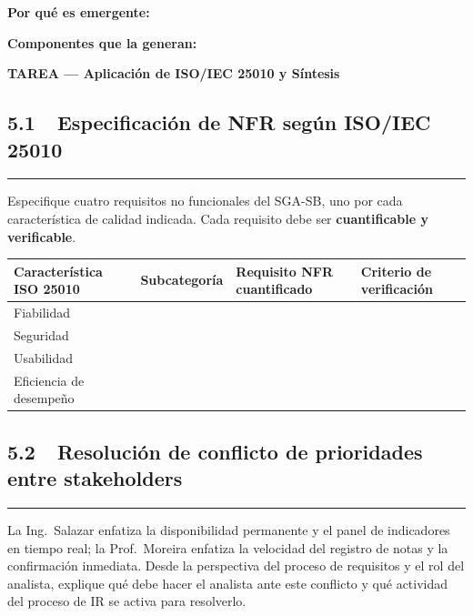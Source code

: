 \documentclass[11pt,a4paper]{article}
\newcommand{\pts}[1]{%
	\hfill\tikz[baseline=(X.base)]{%
		\node[fill=uteqgold,text=white,font=\small\bfseries,
		rounded corners=3pt,inner sep=3pt](X){#1};}}
\newcommand{\secbox}[1]{%
	\par\vspace{8pt}%
	\noindent\colorbox{uteqgreen}{%
		\parbox{\dimexpr\linewidth-2\fboxsep}{%
			\color{white}\bfseries\large #1}}%
	\par\vspace{6pt}}
\newcommand{\thdr}[1]{\cellcolor{darkgreen}\color{white}\bfseries #1}
\begin{document}
	\textbf{Por qué es emergente:} \dotfill
	
	 \dotfill
	
	\textbf{Componentes que la generan:} \dotfill
	
	\newpage
	\secbox{TAREA --- Aplicación de ISO/IEC 25010 y Síntesis}
	
	\subsection*{5.1~~Especificación de NFR según ISO/IEC 25010 \pts{1.0 pts}}
	
	\noindent\rule{4pt}{12pt}\hspace{4pt}%
	Especifique cuatro requisitos no funcionales del SGA-SB, uno por cada
	característica de calidad indicada. Cada requisito debe ser
	\textbf{cuantificable y verificable}.
	
	\vspace{6pt}
	\noindent
	{\small
		\begin{tabular}{|p{2.2cm}|p{2cm}|p{4.5cm}|p{4.5cm}|}
			\hline
			\thdr{\scriptsize Característica ISO 25010} &
			\thdr{Subcategoría} &
			\thdr{Requisito NFR cuantificado} &
			\thdr{Criterio de verificación} \\
			\hline
			Fiabilidad & & & \\[1.2cm]\hline
			Seguridad & & & \\[1.2cm]\hline
			Usabilidad & & & \\[1.2cm]\hline
			Eficiencia de desempeño & & & \\[1.2cm]\hline
	\end{tabular}}
	
	\subsection*{5.2~~Resolución de conflicto de prioridades entre stakeholders
		\pts{0.5 pts}}
	
	\noindent\rule{4pt}{12pt}\hspace{4pt}%
	La Ing.\ Salazar enfatiza la disponibilidad permanente y el panel de
	indicadores en tiempo real; la Prof.\ Moreira enfatiza la velocidad del
	registro de notas y la confirmación inmediata. Desde la perspectiva del
	proceso de requisitos y el rol del analista, explique qué debe hacer el
	analista ante este conflicto y qué actividad del proceso de IR se activa
	para resolverlo.
	
\end{document}
